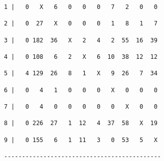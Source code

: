 \documentclass[titlepage,11pt]{article}
\begin{document}
{\begin{verbatim}
1 |   0   X   6   0   0   0   7   2   0   0

2 |   0  27   X   0   0   0   1   8   1   7

3 |   0 182  36   X   2   4   2  55  16  39

4 |   0 108   6   2   X   6  10  38  12  12

5 |   4 129  26   8   1   X   9  26   7  34

6 |   0   4   1   0   0   0   X   0   0   0

7 |   0   4   0   0   0   0   0   X   0   0

8 |   0 226  27   1  12   4  37  58   X  19

9 |   0 155   6   1  11   3   0  53   5   X

--------------------------------------------
\end{verbatim}
}
\end{document}
